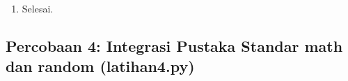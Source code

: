 \documentclass[12pt,a4paper]{article}
\begin{document}
\begin{enumerate}
\begin{enumerate}[label=\alph*.]
        \begin{enumerate}[label=\roman*.]
            \item Baca masukan nilai integer ke variabel \texttt{n}.
            \item Uji kondisi menggunakan pemanggilan fungsi predikat: jika \texttt{lulus(n)} bernilai \textit{True}, tetapkan $status = \text{"Lulus"}$, selain itu tetapkan $status = \text{"Tidak lulus"}$.
            \item Cetak informasi dalam format: \texttt{n, "->", nilai\_huruf(n), "|", status}.
        \end{enumerate}
        \item Selesai.
    \end{enumerate}
\end{enumerate}

\subsection{Percobaan 4: Integrasi Pustaka Standar math dan random (latihan4.py)}
\end{document}
